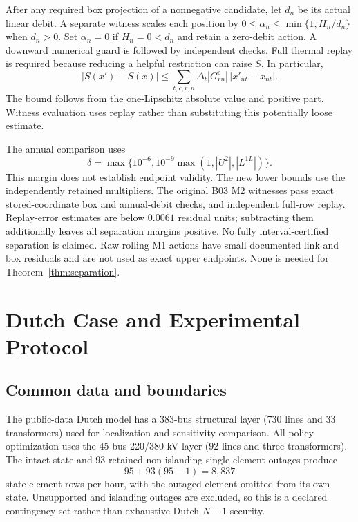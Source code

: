 \documentclass[10pt,journal]{IEEEtran}
\begin{document}
After any required box projection of a nonnegative candidate, let $d_n$ be its actual linear debit. A separate witness scales each position by $0\leq\alpha_n\leq\min\{1,H_n/d_n\}$ when $d_n>0$. Set $\alpha_n=0$ if $H_n=0<d_n$ and retain a zero-debit action. A downward numerical guard is followed by independent checks. Full thermal replay is required because reducing a helpful restriction can raise $S$. In particular,
\begin{equation}
|S(x')-S(x)|\leq\sum_{t,c,r,n}\Delta_t|G_{rn}^c|\,|x'_{nt}-x_{nt}|.
\label{eq:lipschitz}
\end{equation}
The bound follows from the one-Lipschitz absolute value and positive part. Witness evaluation uses replay rather than substituting this potentially loose estimate.

The annual comparison uses
\begin{equation}
\delta=\max\{10^{-6},10^{-9}\max(1,|U^2|,|L^{1L}|)\}.
\label{eq:delta}
\end{equation}
This margin does not establish endpoint validity. The new lower bounds use the independently retained multipliers. The original B03 M2 witnesses pass exact stored-coordinate box and annual-debit checks, and independent full-row replay. Replay-error estimates are below $0.0061$ residual units; subtracting them additionally leaves all separation margins positive. No fully interval-certified separation is claimed. Raw rolling M1 actions have small documented link and box residuals and are not used as exact upper endpoints. None is needed for Theorem~\ref{thm:separation}.

\section{Dutch Case and Experimental Protocol}
\label{sec:case}
\subsection{Common data and boundaries}
The public-data Dutch model \cite{Zomerdijk2022,ZomerdijkData} has a 383-bus structural layer (730 lines and 33 transformers) used for localization and sensitivity comparison. All policy optimization uses the 45-bus 220/380-kV layer (92 lines and three transformers). The intact state and 93 retained non-islanding single-element outages produce
\begin{equation}
95+93(95-1)=8{,}837
\label{eq:rowcount}
\end{equation}
state-element rows per hour, with the outaged element omitted from its own state. Unsupported and islanding outages are excluded, so this is a declared contingency set rather than exhaustive Dutch $N-1$ security.
\end{document}
